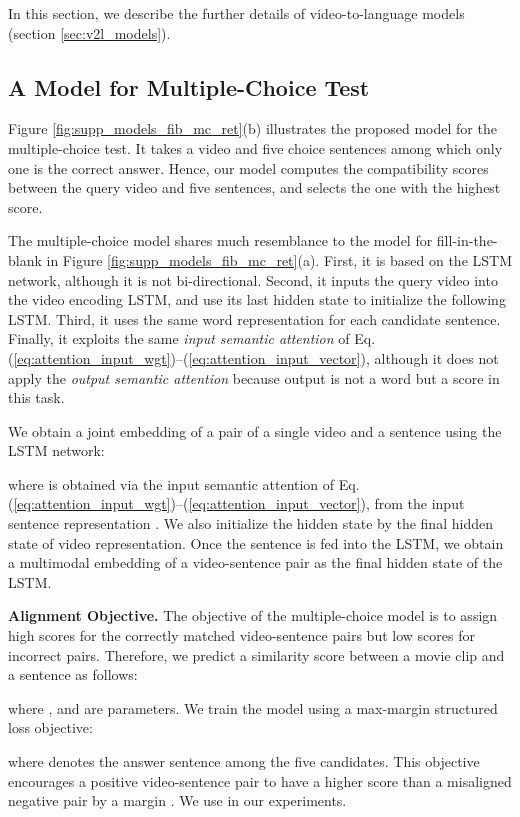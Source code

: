 \documentclass[10pt,twocolumn,letterpaper]{article}
\theoremstyle{nonumberplain}
\begin{document}
In this section, we describe the further details of video-to-language models (section \ref{sec:v2l_models}).



\smallskip
\subsection{A Model for Multiple-Choice Test}
\label{subsec:supp_model_choice}


Figure \ref{fig:supp_models_fib_mc_ret}(b) illustrates the proposed model for the multiple-choice test.
It takes a video and five choice sentences among which only one is the correct answer.
Hence, our model computes the compatibility scores between the query video and five sentences,
and selects the one with the highest score.

The multiple-choice model shares much resemblance to the model for fill-in-the-blank in Figure \ref{fig:supp_models_fib_mc_ret}(a).
First, it is based on the LSTM network, although it is not bi-directional.
Second, it inputs the query video into the video encoding LSTM, and use its last hidden state  to initialize the following LSTM.
Third, it uses the same word representation  for each candidate sentence.
Finally, it exploits the same \textit{input semantic attention} of Eq.(\ref{eq:attention_input_wgt})--(\ref{eq:attention_input_vector}),
although it does not apply the \textit{output semantic attention} because output is not a word but a score in this task.


We obtain a joint embedding of a pair of a single video and a sentence using the LSTM network:

where 
is obtained via the input semantic attention  of Eq.(\ref{eq:attention_input_wgt})--(\ref{eq:attention_input_vector}),
from the input sentence representation .
We also initialize the hidden state  by the final hidden state of video representation.
Once the sentence is fed into the LSTM, we obtain a multimodal embedding of a video-sentence pair as the final hidden state  of the LSTM.

\textbf{Alignment Objective.}
The objective of the multiple-choice model is to assign high scores for the correctly matched video-sentence pairs but low scores for incorrect pairs.
Therefore, we predict a similarity score  between a movie clip  and a sentence  as follows:

where ,  and 
are parameters.
We train the model using a max-margin structured loss objective:

where  denotes the answer sentence among the five candidates.
This objective encourages a positive video-sentence pair to have a higher score than a misaligned negative pair by a margin .
We use  in our experiments.
\end{document}
